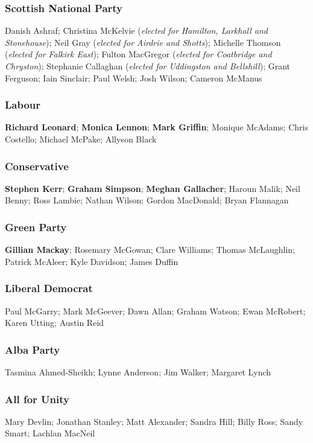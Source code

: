 \begin{resultsiii}
	\subsubsection*{Scottish National Party}
	Danish Ashraf; Christina McKelvie (\emph{elected for Hamilton, Larkhall and Stonehouse}); Neil Gray (\emph{elected for Airdrie and Shotts}); Michelle Thomson (\emph{elected for Falkirk East}); Fulton MacGregor (\emph{elected for Coatbridge and Chryston}); Stephanie Callaghan (\emph{elected for Uddingston and Bellshill}); Grant Ferguson; Iain Sinclair; Paul Welsh; Josh Wilson; Cameron McManus

	\subsubsection*{Labour}
	\textbf{Richard Leonard}; \textbf{Monica Lennon}; \textbf{Mark Griffin}; Monique McAdams; Chris Costello; Michael McPake; Allyson Black

	\subsubsection*{Conservative}
	\textbf{Stephen Kerr}; \textbf{Graham Simpson}; \textbf{Meghan Gallacher}; Haroun Malik; Neil Benny; Ross Lambie; Nathan Wilson; Gordon MacDonald; Bryan Flannagan

	\subsubsection*{Green Party}
	\textbf{Gillian Mackay}; Rosemary McGowan; Clare Williams; Thomas McLaughlin; Patrick McAleer; Kyle Davidson; James Duffin

	\subsubsection*{Liberal Democrat}
	Paul McGarry; Mark McGeever; Dawn Allan; Graham Watson; Ewan McRobert; Karen Utting; Austin Reid

	\subsubsection*{Alba Party}
	Tasmina Ahmed-Sheikh; Lynne Anderson; Jim Walker; Margaret Lynch
	
	\subsubsection*{All for Unity}
	Mary Devlin; Jonathan Stanley; Matt Alexander; Sandra Hill; Billy Ross; Sandy Smart; Lachlan MacNeil
	

\end{resultsiii}
